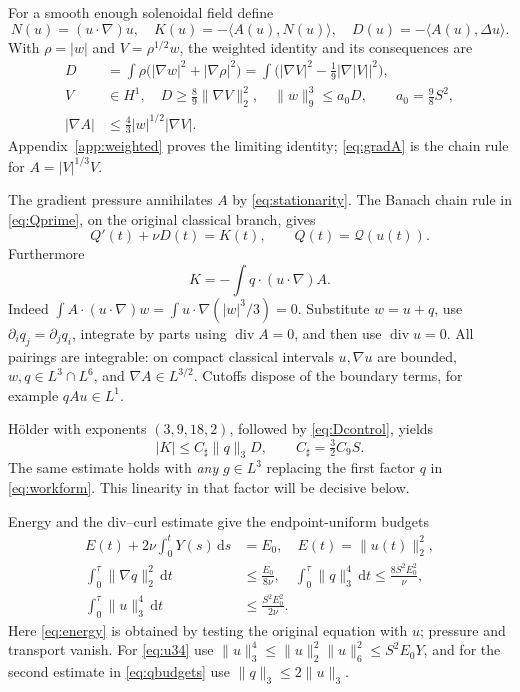 \documentclass[11pt,a4paper]{article}
\theoremstyle{definition}\newtheorem{definition}[theorem]{Definition}
\theoremstyle{remark}\newtheorem{remark}[theorem]{Remark}
\newcommand{\Q}{\mathcal Q}
\newcommand{\dd}{\,\mathrm d}
\newcommand{\norm}[1]{\lVert #1\rVert}
\newcommand{\ip}[2]{\langle #1,#2\rangle}
\newcommand{\diver}{\operatorname{div}}
\numberwithin{equation}{section}
\begin{document}
For a smooth enough solenoidal field define
\begin{equation}\label{eq:KD}
 N(u)=(u\cdot\nabla)u,\quad
 K(u)=-\ip{A(u)}{N(u)},\quad D(u)=-\ip{A(u)}{\Delta u}.
\end{equation}
With $\rho=|w|$ and $V=\rho^{1/2}w$, the weighted identity and its consequences are
\begin{align}
 D&=\int\rho\bigl(|\nabla w|^2+|\nabla\rho|^2\bigr)
   =\int\bigl(|\nabla V|^2-\tfrac19|\nabla|V||^2\bigr),\label{eq:Didentity}\\
 V&\in H^1,\quad
 D\ge\tfrac89\norm{\nabla V}_2^2,\quad
 \norm w_9^3\le a_0D,\qquad a_0=\tfrac98S^2,\label{eq:Dcontrol}\\
 |\nabla A|&\le\tfrac43|w|^{1/2}|\nabla V|.\label{eq:gradA}
\end{align}
Appendix~\ref{app:weighted} proves the limiting identity; \eqref{eq:gradA} is the chain rule for $A=|V|^{1/3}V$.

The gradient pressure annihilates $A$ by \eqref{eq:stationarity}. The Banach chain rule in \eqref{eq:Qprime}, on the original classical branch, gives
\begin{equation}\label{eq:balance}
 Q'(t)+\nu D(t)=K(t),\qquad Q(t)=\Q(u(t)).
\end{equation}
Furthermore
\begin{equation}\label{eq:workform}
 K=-\int q\cdot(u\cdot\nabla)A.
\end{equation}
Indeed $\int A\cdot(u\cdot\nabla)w=\int u\cdot\nabla(|w|^3/3)=0$. Substitute $w=u+q$, use $\partial_iq_j=\partial_jq_i$, integrate by parts using $\diver A=0$, and then use $\diver u=0$. All pairings are integrable: on compact classical intervals $u,\nabla u$ are bounded, $w,q\in L^3\cap L^6$, and $\nabla A\in L^{3/2}$. Cutoffs dispose of the boundary terms, for example $qAu\in L^1$.

H\"older with exponents $(3,9,18,2)$, followed by \eqref{eq:Dcontrol}, yields
\begin{equation}\label{eq:Kq}
 |K|\le C_\sharp\norm q_3D,\qquad C_\sharp=\tfrac32C_9S.
\end{equation}
The same estimate holds with \emph{any} $g\in L^3$ replacing the first factor $q$ in \eqref{eq:workform}. This linearity in that factor will be decisive below.

Energy and the div--curl estimate give the endpoint-uniform budgets
\begin{align}
 E(t)+2\nu\int_0^tY(s)\dd s&=E_0,\quad E(t)=\norm{u(t)}_2^2,\label{eq:energy}\\
 \int_0^\tau\norm{\nabla q}_2^2\dd t&\le\frac{E_0}{8\nu},\quad
 \int_0^\tau\norm q_3^4\dd t\le\frac{8S^2E_0^2}{\nu},\label{eq:qbudgets}\\
 \int_0^\tau\norm u_3^4\dd t&\le\frac{S^2E_0^2}{2\nu}.\label{eq:u34}
\end{align}
Here \eqref{eq:energy} is obtained by testing the original equation with $u$; pressure and transport vanish. For \eqref{eq:u34} use
$\norm u_3^4\le\norm u_2^2\norm u_6^2\le S^2E_0Y$, and for the second estimate in \eqref{eq:qbudgets} use $\norm q_3\le2\norm u_3$.
\end{document}
